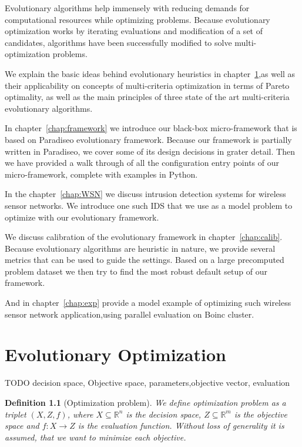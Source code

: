 \documentclass[12pt,oneside]{fithesis2}
\newtheorem{defn}{Definition}
\begin{document}
Evolutionary algorithms help immensely with reducing demands for computational resources while optimizing problems. Because evolutionary optimization works by iterating evaluations and modification of a set of candidates, algorithms have been successfully modified to solve multi-optimization problems.

We explain the basic ideas behind evolutionary heuristics in chapter~\ref{chap:evolution},as well as their applicability on concepts of multi-criteria optimization in terms of Pareto optimality, as well as the main principles of three state of the art multi-criteria evolutionary algorithms. 

In chapter~\ref{chap:framework} we introduce our black-box micro-framework that is based on Paradiseo evolutionary framework. Because our framework is partially written in Paradiseo, we cover some of its design decisions in grater detail. Then we have provided a walk through of all the configuration entry points of our micro-framework, complete with examples in Python.

In the chapter~\ref{chap:WSN} we discuss intrusion detection systems for wireless sensor networks. We introduce one such IDS that we use as a model problem to optimize with our evolutionary framework.

We discuss calibration of the evolutionary framework in chapter~\ref{chap:calib}. Because evolutionary algorithms are heuristic in nature, we provide several metrics that can be used to guide the settings. Based on a large precomputed problem dataset we then try to find the most robust default setup of our framework. 

And in chapter~\ref{chap:exp} provide a model example of optimizing such wireless sensor network application,using parallel evaluation on Boinc cluster. 

\chapter{Evolutionary Optimization}
\label{chap:evolution}

TODO decision space, Objective space, parameters,objective vector, evaluation

\begin{defn}[Optimization problem]
We define optimization problem as a triplet $(X,Z,f)$,
 where $X \subseteq \mathbb{R}^n$ is the decision space,
$Z \subseteq \mathbb{R}^m$ is the objective space and $f:X \to Z$ is the evaluation function.
Without loss of generality it is assumed, that we want to minimize each objective.
\end{defn}
\end{document}
